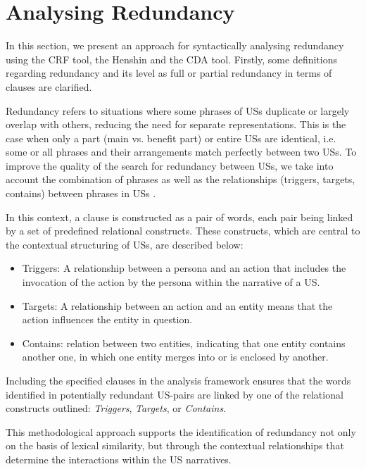\section{Analysing Redundancy}\label{redundancy}
In this section, we present an approach for syntactically analysing redundancy using the CRF tool, the Henshin and the CDA tool. Firstly, some definitions regarding redundancy and its level as full or partial redundancy in terms of clauses are clarified.

\begin{definition}
	Redundancy refers to situations where some phrases of USs duplicate or largely overlap with others, reducing the need for separate representations. This is the case when only a part (main vs. benefit part) or entire USs are identical, i.e. some or all phrases and their arrangements match perfectly between two USs. To improve the quality of the search for redundancy between USs, we take into account the combination of phrases as well as the relationships (triggers, targets, contains) between phrases in USs .
\end{definition}	
\begin{definition}
	In this context, a clause is constructed as a pair of words, each pair being linked by a set of predefined relational constructs. These constructs, which are central to the contextual structuring of USs, are described below:
	\begin{itemize}
		
		\item Triggers: A relationship between a persona and an action that includes the invocation of the action by the persona within the narrative of a US.
		
		\item Targets: A relationship between an action and an entity means that the action influences the entity in question.
		
		\item Contains: relation between two entities, indicating that one entity contains another one, in which one entity merges into or is enclosed by another. 
		
	\end{itemize}
	Including the specified clauses in the analysis framework ensures that the words identified in potentially redundant US-pairs are linked by one of the relational constructs outlined: \textit{Triggers}, \textit{Targets}, or \textit{Contains}. 
	
	This methodological approach supports the identification of redundancy not only on the basis of lexical similarity, but through the contextual relationships that determine the interactions within the US narratives.
\end{definition}

